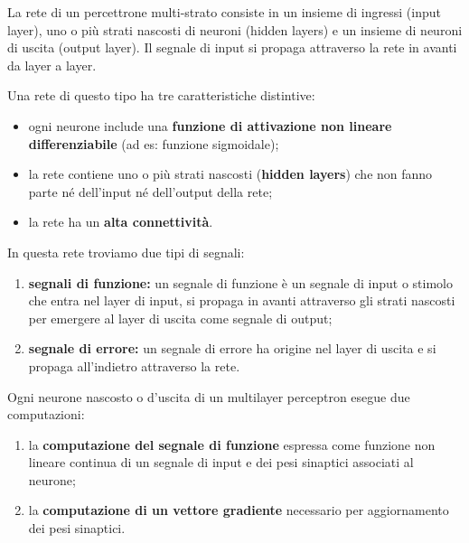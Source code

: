 La rete di un percettrone multi-strato consiste in un insieme di ingressi (input layer), uno o più strati nascosti di neuroni (hidden layers) e un insieme di neuroni di uscita (output layer). Il segnale di input si propaga attraverso la rete in avanti da layer a layer.


Una rete di questo tipo ha tre caratteristiche distintive:
\begin{itemize}
    \item ogni neurone include una \textbf{funzione di attivazione non lineare differenziabile }(ad es: funzione
sigmoidale);
    \item la rete contiene uno o più strati nascosti (\textbf{hidden layers}) che non fanno parte né dell'input né dell'output della rete;
    \item la rete ha un \textbf{alta connettività}.
\end{itemize}
In questa rete troviamo due tipi di segnali:
\begin{enumerate}
    \item \textbf{segnali di funzione:} un segnale di funzione è un segnale di input o stimolo che entra nel layer di input, si propaga in avanti attraverso gli strati nascosti per emergere al layer di uscita come segnale di output;
    \item \textbf{segnale di errore:} un segnale di errore ha origine nel layer di uscita e si propaga all'indietro attraverso la rete.
\end{enumerate}

Ogni neurone nascosto o d'uscita di un multilayer perceptron esegue due computazioni:
\begin{enumerate}
    \item la \textbf{computazione del segnale di funzione} espressa come funzione non lineare continua
di un segnale di input e dei pesi sinaptici associati al neurone;
    \item la \textbf{computazione di un vettore gradiente} necessario per aggiornamento dei pesi
sinaptici.
\end{enumerate}


\newpage

